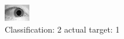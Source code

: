\begin{figure}[h!]
\begin{center}
\includegraphics[width=0.60\columnwidth]{figures/ID1454_class_2_target_1.png}
\end{center}
\caption{ Classification: 2 actual target: 1}
\label{fig:ID1454_class_2_target_1}
\end{figure}
